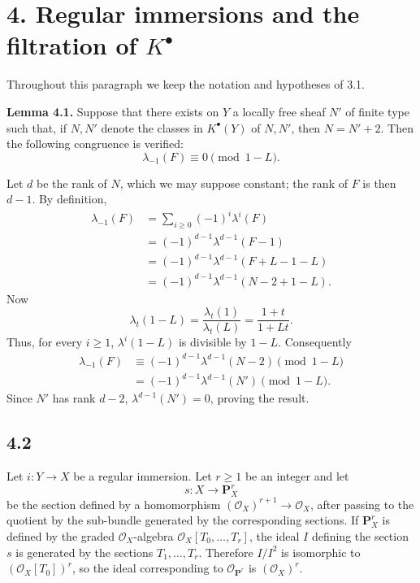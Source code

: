 \section*{4. Regular immersions and the filtration of \(K^\bullet\)}

Throughout this paragraph we keep the notation and hypotheses of 3.1.

\textbf{Lemma 4.1.} Suppose that there exists on \(Y\) a locally free sheaf \(N'\) of finite type such that, if \(N,N'\) denote the classes in \(K^\bullet(Y)\) of \(N,N'\), then \(N=N'+2\). Then the following congruence is verified:
\[
  \lambda_{-1}(F)\equiv 0 \pmod{1-L}.
\]

Let \(d\) be the rank of \(N\), which we may suppose constant; the rank of \(F\) is then \(d-1\). By definition,
\[
\begin{aligned}
\lambda_{-1}(F)
 &= \sum_{i\ge0}(-1)^i\lambda^i(F)\\
 &= (-1)^{d-1}\lambda^{d-1}(F-1)\\
 &= (-1)^{d-1}\lambda^{d-1}(F+L-1-L)\\
 &= (-1)^{d-1}\lambda^{d-1}(N-2+1-L).
\end{aligned}
\]
Now
\[
  \lambda_t(1-L)=\frac{\lambda_t(1)}{\lambda_t(L)}
  =\frac{1+t}{1+Lt}.
\]
Thus, for every \(i\ge1\), \(\lambda^i(1-L)\) is divisible by \(1-L\). Consequently
\[
\begin{aligned}
\lambda_{-1}(F)
  &\equiv (-1)^{d-1}\lambda^{d-1}(N-2) \pmod{1-L}\\
  &=(-1)^{d-1}\lambda^{d-1}(N') \pmod{1-L}.
\end{aligned}
\]
Since \(N'\) has rank \(d-2\), \(\lambda^{d-1}(N')=0\), proving the result.

\subsection*{4.2}

Let \(i:Y\to X\) be a regular immersion. Let \(r\ge1\) be an integer and let
\[
  s:X\longrightarrow \mathbf P_X^r
\]
be the section defined by a homomorphism \((\mathcal O_X)^{r+1}\to\mathcal O_X\), after passing to the quotient by the sub-bundle generated by the corresponding sections. If \(\mathbf P_X^r\) is defined by the graded \(\mathcal O_X\)-algebra \(\mathcal O_X[T_0,\ldots,T_r]\), the ideal \(I\) defining the section \(s\) is generated by the sections \(T_1,\ldots,T_r\). Therefore \(I/I^2\) is isomorphic to \((\mathcal O_X[T_0])^r\), so the ideal corresponding to \(\mathcal O_{\mathbf P^r}\) is \((\mathcal O_X)^r\).


